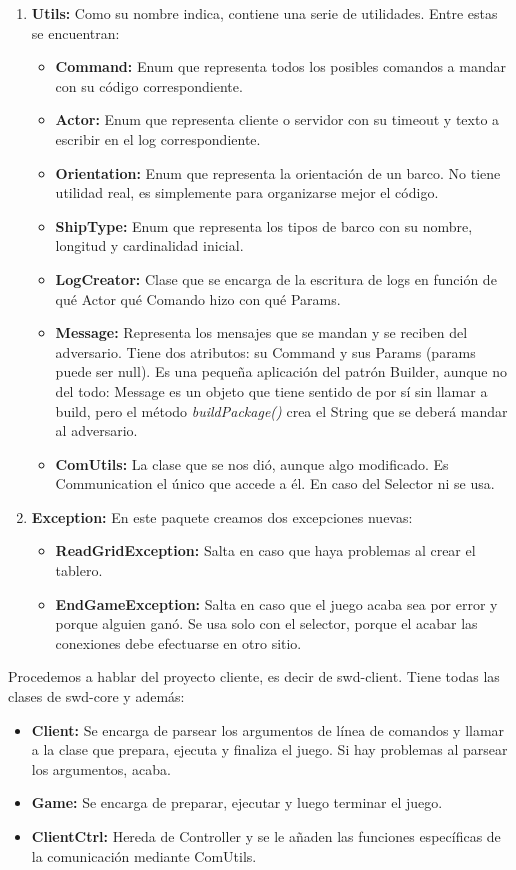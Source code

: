 \begin{enumerate}
\item \textbf{Utils:} Como su nombre indica, contiene una serie de utilidades. Entre estas se encuentran:
	\begin{itemize}
	\item \textbf{Command:} Enum que representa todos los posibles comandos a mandar con su código correspondiente.
	\item \textbf{Actor:} Enum que representa cliente o servidor con su timeout y texto a escribir en el log correspondiente.
	\item \textbf{Orientation:} Enum que representa la orientación de un barco. No tiene utilidad real, es simplemente para organizarse mejor el código.
	\item \textbf{ShipType:} Enum que representa los tipos de barco con su nombre, longitud y cardinalidad inicial.
	\item \textbf{LogCreator:} Clase que se encarga de la escritura de logs en función de qué Actor qué Comando hizo con qué Params.
	\item \textbf{Message:} Representa los mensajes que se mandan y se reciben del adversario. Tiene dos atributos: su Command y sus Params (params puede ser null). Es una pequeña aplicación del patrón Builder, aunque no del todo: Message es un objeto que tiene sentido de por sí sin llamar a build, pero el método \textit{buildPackage()} crea el String que se deberá mandar al adversario.
	\item \textbf{ComUtils:} La clase que se nos dió, aunque algo modificado. Es Communication el único que accede a él. En caso del Selector ni se usa.
	\end{itemize}
\item \textbf{Exception:} En este paquete creamos dos excepciones nuevas:
	\begin{itemize}
	\item \textbf{ReadGridException:} Salta en caso que haya problemas al crear el tablero.
	\item \textbf{EndGameException:} Salta en caso que el juego acaba sea por error y porque alguien ganó. Se usa solo con el selector, porque el acabar las conexiones debe efectuarse en otro sitio.
	\end{itemize}
\end{enumerate}

Procedemos a hablar del proyecto cliente, es decir de swd-client. Tiene todas las clases de swd-core y además:
\begin{itemize}
\item \textbf{Client:} Se encarga de parsear los argumentos de línea de comandos y llamar a la clase que prepara, ejecuta y finaliza el juego. Si hay problemas al parsear los argumentos, acaba.
\item \textbf{Game:} Se encarga de preparar, ejecutar y luego terminar el juego.
\item \textbf{ClientCtrl:} Hereda de Controller y se le añaden las funciones específicas de la comunicación mediante ComUtils.
\end{itemize}

